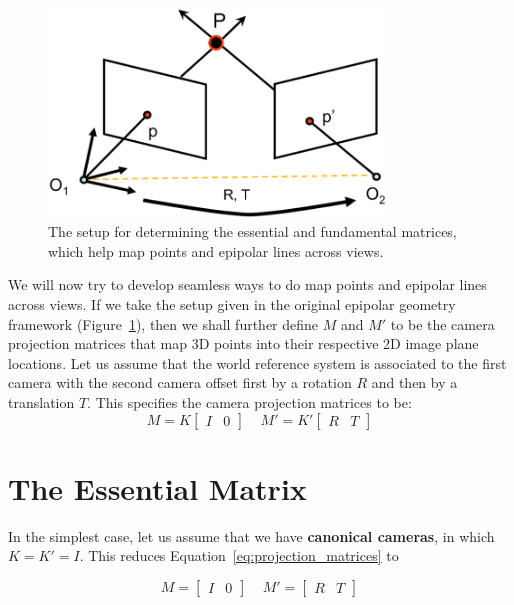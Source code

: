 \documentclass[a4paper, 12pt]{article}
\renewcommand\emph{\textbf}
\begin{document}
\begin{figure}[h!]
\centering
\includegraphics[width=0.8\textwidth]{figures/essential_fundamental_setup.png}
\caption{The setup for determining the essential and fundamental matrices, which help map points and epipolar lines across views.}
\label{fig:essential_fundamental_setup}
\end{figure}

We will now try to develop seamless ways to do map points and epipolar lines across views. If we take the setup given in the original epipolar geometry framework (Figure~\ref{fig:essential_fundamental_setup}), then we shall further define $M$ and $M'$ to be the camera projection matrices that map 3D points into their respective 2D image plane locations. Let us assume that the world reference system is associated to the first camera with the second camera offset first by a rotation $R$ and then by a translation $T$. This specifies the camera projection matrices to be:
\begin{equation}
    M = K\begin{bmatrix} I & 0\end{bmatrix} \ \ \ \ \ M' = K'\begin{bmatrix}R & T\end{bmatrix}
    \label{eq:projection_matrices}
\end{equation}

\section{The Essential Matrix}
In the simplest case, let us assume that we have \emph{canonical cameras}, in which $K = K' = I$. This reduces Equation~\ref{eq:projection_matrices} to 

\begin{equation}
    M = \begin{bmatrix} I & 0\end{bmatrix} \ \ \ \ \ M' = \begin{bmatrix}R & T\end{bmatrix}
    \label{eq:projection_matrices_canonical}
\end{equation}
\end{document}
